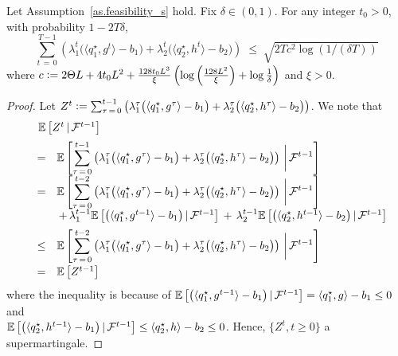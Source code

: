 \documentclass[12pt, final]{l4dc2023}
\begin{document}
\begin{lemma}\label{lem.violation_s}
	Let Assumption~\ref{as.feasibility_s} hold.
	Fix $\delta\in (0,1)$. 
	For any integer $t_0>0$, with probability $1-2T\delta$,
	\[
	\sum_{t\,=\,0}^{T-1}
	\left(
	\lambda_1^{t} \big(\langle{ q_1^\star},{g^{t}}\rangle - b_1\big)
	+
	\lambda_2^{t} \big(\langle{ q_2^\star},{h^{t}}\rangle -b_2\big)
	\right)
	\;\leq\; \sqrt{2T c^2 \log (1/(\delta T))}
	\]
	where
	$c \mathrel{\mathop:}=  2\Theta L + 4 t_0 L^2 + \tfrac{128 t_0 L^3}{\xi} \left(\log \left(\tfrac{128 L^2}{\xi}\right) +\log\tfrac{1}{\delta}\right)$ 
	and
	$\xi >0$. 
\end{lemma}
\begin{proof}
	Let $Z^t \mathrel{\mathop:}= \sum_{\tau\,=\,0}^{t-1} \left(
	\lambda_1^{\tau} \big(\langle{ q_1^\star},{g^{\tau}}\rangle -b_1\big)+\lambda_2^{\tau} \big(\langle{ q_2^\star},{h^{\tau}}\rangle -b_2\big) \right)$. We note that 
	\[
	\begin{array}{rcl}
	&& \!\!\!\! \!\!\!\! \!\!
	\mathbb{E} \sbr{Z^t \,\vert\,\calF^{t-1}} 
	\\[0.2cm]
	&=& \displaystyle
	\mathbb{E} \sbr{ \sum_{\tau\,=\,0}^{t-1}
		\left(
		\lambda_1^{\tau} \big(\langle{ q_1^\star},{g^{\tau}}\rangle -b_1\big)
		+
		\lambda_2^{\tau} \big(\langle{ q_2^\star},{h^{\tau}}\rangle -b_2\big)
		\right)
		\,\bigg\vert\,\calF^{t-1}}
	\\[0.2cm]
	&=&  \displaystyle
	\mathbb{E} \sbr{ \sum_{\tau\,=\,0}^{t-2}
		\left(
		\lambda_1^{\tau} \big(\langle{ q_1^\star},{g^{\tau}}\rangle -b_1\big)
		+
		\lambda_2^{\tau} \big( \langle{ q_2^\star},{h^{\tau}}\rangle -b_2\big)
		\right)
		\,\bigg\vert\,\calF^{t-1}}
	\\[0.2cm]
	&&
	\,+\, 
	\lambda_1^{t-1} \mathbb{E} \sbr{\big(\langle{ q_1^\star},{g^{t-1}}\rangle -b_1\big)\,\vert\,\calF^{t-1}}
	\,+\,
	\lambda_2^{t-1} \mathbb{E} \sbr{\big(\langle{ q_2^\star},{h^{t-1}}\rangle -b_2\big)\,\vert\,\calF^{t-1}}
	\\[0.2cm]
	&\leq&  \displaystyle
	\mathbb{E} \sbr{ \sum_{\tau\,=\,0}^{t-2}
		\left(
		\lambda_1^{\tau} \big(\langle{ q_1^\star},{g^{\tau}}\rangle -b_1\big)
		+
		\lambda_2^{\tau} \big( \langle{ q_2^\star},{h^{\tau}}\rangle -b_2\big)
		\right)
		\,\bigg\vert\,\calF^{t-1}}
	\\[0.4cm]
	&=&
	\mathbb{E} \sbr{Z^{t-1}} 
	\end{array}
	\]
	where the inequality is because of $\mathbb{E} \left[\big(\langle{ q_1^\star},{g^{t-1}}\rangle 
		-b_1\big)\,\vert\,{\mathcal{F}}^{t-1}\right] = \langle{ q_1^\star},{g}\rangle 
	-b_1\leq 0$ and \\
	$ \mathbb{E} \left[\big( \langle{ q_2^\star},{h^{t-1}}\rangle -b_1\big)\,\vert\,{\mathcal{F}}^{t-1}\right] \leq \langle{ q_2^\star},{h}\rangle -b_2 \leq 0$. Hence,  $\{Z^t,t\geq0 \}$ a supermartingale. 
	

\end{proof}
\end{document}
